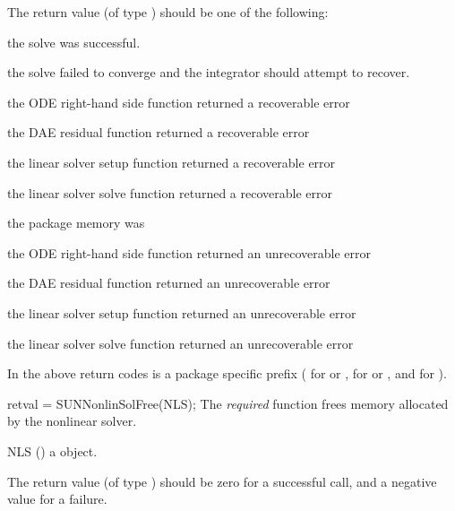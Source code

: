 {
  The return value  (of type ) should be one of the
  following:
  \begin{args}
  \item[\Id{SUN\_NLS\_SUCCESS}]
    the solve was successful.
  \item[\Id{SUN\_NLS\_CONV\_RECVR}]
    the solve failed to converge and the integrator should attempt to
    recover.
  \item[\id{*\_RHSFUNC\_RECVR}]
    the ODE right-hand side function returned a recoverable error
  \item[\id{*\_RES\_RECVR}]
    the DAE residual function returned a recoverable error
  \item[\id{*\_LSETUP\_RECVR}]
    the linear solver setup function returned a recoverable error
  \item[\id{*\_LSOLVE\_RECVR}]
    the linear solver solve function returned a recoverable error
  \item[\id{*\_MEM\_NULL}]
    the {\sundials} package memory was 
  \item[\id{*\_RHSFUNC\_FAIL}]
    the ODE right-hand side function returned an unrecoverable error
  \item[\id{*\_RES\_FAIL}]
    the DAE residual function returned an unrecoverable error
  \item[\id{*\_LSETUP\_FAIL}]
    the linear solver setup function returned an unrecoverable error
  \item[\id{*\_LSOLVE\_FAIL}]
    the linear solver solve function returned an unrecoverable error
  \end{args}
  In the above return codes \id{*} is a {\sundials} package specific
  prefix ( for {\cvode} or {\cvodes},  for {\ida} or
  {\idas}, and  for {\arkode}).
}
{}
{
  retval = SUNNonlinSolFree(NLS);
}
{
  The \textit{required} function  frees memory
  allocated by the nonlinear solver.
}
{
  \begin{args}[NLS]
  \item[NLS] ()
    a {\sunnonlinsol} object.
  \end{args}
}
{
  The return value  (of type ) should be zero for a
  successful call, and a negative value for a failure.
}
{}


